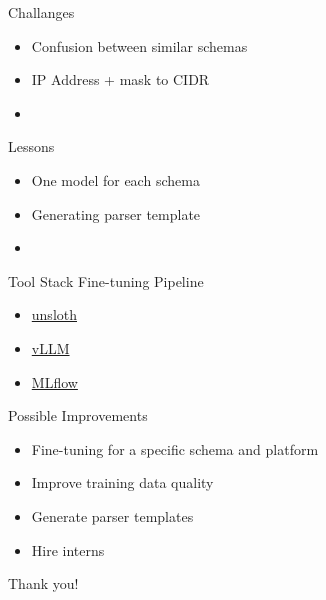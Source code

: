 \documentclass[aspectratio=169]{beamer}
\begin{document}
\begin{frame}{Challanges}

  \begin{itemize}
    \setlength\itemsep{1em}
    \item Confusion between similar schemas
    \item IP Address + mask to CIDR
    \item 
  \end{itemize}

\end{frame}

\begin{frame}{Lessons}

  \begin{itemize}
    \setlength\itemsep{1em}
    \item One model for each schema
    \item Generating parser template
    \item 
  \end{itemize}

\end{frame}

\begin{frame}{Tool Stack Fine-tuning Pipeline}

  \begin{itemize}
    \setlength\itemsep{1em}
    \item \href{https://github.com/unslothai/unsloth}{unsloth}
    \item \href{https://github.com/vllm-project/vllm}{vLLM}
    \item \href{https://github.com/mlflow/mlflow}{MLflow}
  \end{itemize}

\end{frame}

\begin{frame}{Possible Improvements}

  \begin{itemize}
    \setlength\itemsep{1em}
    \item Fine-tuning for a specific schema and platform
    \item Improve training data quality
    \item Generate parser templates
    \item Hire interns
  \end{itemize}

\end{frame}


{
  \begin{frame}[plain,c]
    \begin{center}
      \Huge \color[rgb]{1,1,1}Thank you!
    \end{center}
  \end{frame}
}
\end{document}
